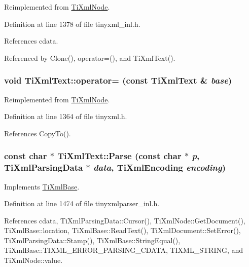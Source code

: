 Reimplemented from \hyperlink{class_ti_xml_node_ab6056978923ad8350fb5164af32d8038}{TiXmlNode}.

Definition at line 1378 of file tinyxml\_\-inl.h.

References cdata.

Referenced by Clone(), operator=(), and TiXmlText().\hypertarget{class_ti_xml_text_af5f15d40d048cea7cab9d0eb4fd8a7d2}{
\subsubsection[{operator=}]{\setlength{\rightskip}{0pt plus 5cm}void TiXmlText::operator= (const {\bf TiXmlText} \& {\em base})}}
\label{class_ti_xml_text_af5f15d40d048cea7cab9d0eb4fd8a7d2}


Reimplemented from \hyperlink{class_ti_xml_node_a9eb62a8d95b8a98ec2df481cc9e5a7e2}{TiXmlNode}.

Definition at line 1364 of file tinyxml.h.

References CopyTo().\hypertarget{class_ti_xml_text_a8d2dcfa41fc73d3e62dacc2fcf633819}{
\subsubsection[{Parse}]{\setlength{\rightskip}{0pt plus 5cm}const char $\ast$ TiXmlText::Parse (const char $\ast$ {\em p}, \/  {\bf TiXmlParsingData} $\ast$ {\em data}, \/  {\bf TiXmlEncoding} {\em encoding})}}
\label{class_ti_xml_text_a8d2dcfa41fc73d3e62dacc2fcf633819}


Implements \hyperlink{class_ti_xml_base_a00e4edb0219d00a1379c856e5a1d2025}{TiXmlBase}.

Definition at line 1474 of file tinyxmlparser\_\-inl.h.

References cdata, TiXmlParsingData::Cursor(), TiXmlNode::GetDocument(), TiXmlBase::location, TiXmlBase::ReadText(), TiXmlDocument::SetError(), TiXmlParsingData::Stamp(), TiXmlBase::StringEqual(), TiXmlBase::TIXML\_\-ERROR\_\-PARSING\_\-CDATA, TIXML\_\-STRING, and TiXmlNode::value.

